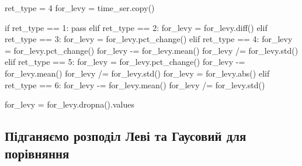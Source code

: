 \documentclass[
  letterpaper,
]{report}
\newenvironment{Shaded}{\begin{snugshade}}{\end{snugshade}}
\newcommand{\BuiltInTok}[1]{\textcolor[rgb]{0.00,0.23,0.31}{#1}}
\newcommand{\ControlFlowTok}[1]{\textcolor[rgb]{0.00,0.23,0.31}{#1}}
\newcommand{\DecValTok}[1]{\textcolor[rgb]{0.68,0.00,0.00}{#1}}
\newcommand{\NormalTok}[1]{\textcolor[rgb]{0.00,0.23,0.31}{#1}}
\newcommand{\OperatorTok}[1]{\textcolor[rgb]{0.37,0.37,0.37}{#1}}
\begin{document}
\begin{Shaded}
\begin{Highlighting}[]
\NormalTok{ret\_type }\OperatorTok{=} \DecValTok{4}
\NormalTok{for\_levy }\OperatorTok{=}\NormalTok{ time\_ser.copy()}

\ControlFlowTok{if}\NormalTok{ ret\_type }\OperatorTok{==} \DecValTok{1}\NormalTok{:}
    \ControlFlowTok{pass}
\ControlFlowTok{elif}\NormalTok{ ret\_type }\OperatorTok{==} \DecValTok{2}\NormalTok{:}
\NormalTok{    for\_levy }\OperatorTok{=}\NormalTok{ for\_levy.diff()}
\ControlFlowTok{elif}\NormalTok{ ret\_type }\OperatorTok{==} \DecValTok{3}\NormalTok{:}
\NormalTok{    for\_levy }\OperatorTok{=}\NormalTok{ for\_levy.pct\_change()}
\ControlFlowTok{elif}\NormalTok{ ret\_type }\OperatorTok{==} \DecValTok{4}\NormalTok{:}
\NormalTok{    for\_levy }\OperatorTok{=}\NormalTok{ for\_levy.pct\_change()}
\NormalTok{    for\_levy }\OperatorTok{{-}=}\NormalTok{ for\_levy.mean()}
\NormalTok{    for\_levy }\OperatorTok{/=}\NormalTok{ for\_levy.std()}
\ControlFlowTok{elif}\NormalTok{ ret\_type }\OperatorTok{==} \DecValTok{5}\NormalTok{: }
\NormalTok{    for\_levy }\OperatorTok{=}\NormalTok{ for\_levy.pct\_change()}
\NormalTok{    for\_levy }\OperatorTok{{-}=}\NormalTok{ for\_levy.mean()}
\NormalTok{    for\_levy }\OperatorTok{/=}\NormalTok{ for\_levy.std()}
\NormalTok{    for\_levy }\OperatorTok{=}\NormalTok{ for\_levy.}\BuiltInTok{abs}\NormalTok{()}
\ControlFlowTok{elif}\NormalTok{ ret\_type }\OperatorTok{==} \DecValTok{6}\NormalTok{:}
\NormalTok{    for\_levy }\OperatorTok{{-}=}\NormalTok{ for\_levy.mean()}
\NormalTok{    for\_levy }\OperatorTok{/=}\NormalTok{ for\_levy.std()}

\NormalTok{for\_levy }\OperatorTok{=}\NormalTok{ for\_levy.dropna().values}
\end{Highlighting}
\end{Shaded}

\hypertarget{ux43fux456ux434ux433ux430ux43dux44fux454ux43cux43e-ux440ux43eux437ux43fux43eux434ux456ux43b-ux43bux435ux432ux456-ux442ux430-ux433ux430ux443ux441ux43eux432ux438ux439-ux434ux43bux44f-ux43fux43eux440ux456ux432ux43dux44fux43dux43dux44f}{%
\subsection{Підганяємо розподіл Леві та Гаусовий для
порівняння}\label{ux43fux456ux434ux433ux430ux43dux44fux454ux43cux43e-ux440ux43eux437ux43fux43eux434ux456ux43b-ux43bux435ux432ux456-ux442ux430-ux433ux430ux443ux441ux43eux432ux438ux439-ux434ux43bux44f-ux43fux43eux440ux456ux432ux43dux44fux43dux43dux44f}}
\end{document}
